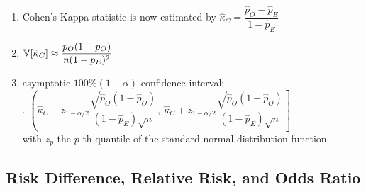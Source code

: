 \begin{enumerate}
    \item Cohen’s Kappa statistic is now estimated by $ \hat{\kappa}_C = \dfrac{\hat{p}_O - \hat{p}_E}{1 - \hat{p}_E} $
    \hfill \cite{statistics/book/Statistics-for-Data-Scientists/Maurits-Kaptein}

    \item $\mathbb{V}[\hat{\kappa}_C] \approx \dfrac{p_O (1 - p_O )}{n(1 - p_E )^2}$
    \hfill \cite{statistics/book/Statistics-for-Data-Scientists/Maurits-Kaptein}

    \item  asymptotic $100\%(1 - \alpha)$ confidence interval:
    \hfill \cite{statistics/book/Statistics-for-Data-Scientists/Maurits-Kaptein}
    \\
    .\hfill
    $
        \left(
            \hat{\kappa}_C - z_{1-\alpha/2} \dfrac{\sqrt{\hat{p}_O (1 - \hat{p}_O )}}{(1 - \hat{p}_E )\sqrt{n} },
            \ \hat{\kappa}_C + z_{1-\alpha/2} \dfrac{\sqrt{\hat{p}_O (1 - \hat{p}_O )}}{(1 - \hat{p}_E )\sqrt{n} }
        \right]
    $
    \hfill \cite{statistics/book/Statistics-for-Data-Scientists/Maurits-Kaptein}
    \\
    with $z_p$ the $p$-th quantile of the standard normal distribution function.
    \hfill \cite{statistics/book/Statistics-for-Data-Scientists/Maurits-Kaptein}
\end{enumerate}









\subsection{Risk Difference, Relative Risk, and Odds Ratio}

